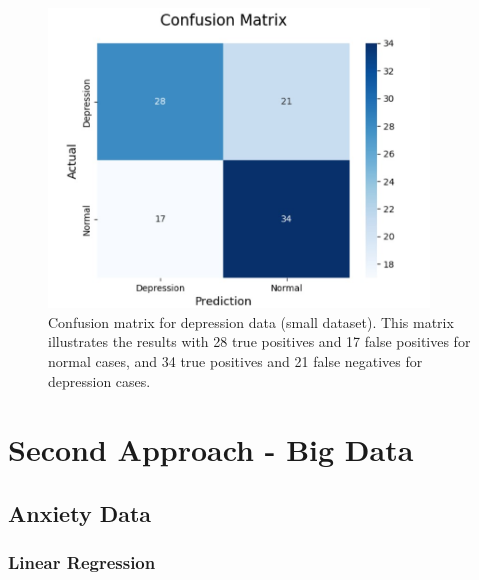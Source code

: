 \documentclass[runningheads,a4paper,11pt]{report}
\begin{document}
\begin{figure}[h]
\centering
\includegraphics[width=0.9\textwidth]{Depression-Data-SmallData.jpg}
\caption[Confusion matrix for depression data (small dataset)]{\centering Confusion matrix for depression data (small dataset). This matrix illustrates the results with 28 true positives and 17 false positives for normal cases, and 34 true positives and 21 false negatives for depression cases.}
\end{figure}

\vspace{1cm} %

\section{Second Approach - Big Data}
\label{section:second}

\subsection{Anxiety Data}
\label{section:anxietydata}

\subsubsection{Linear Regression}
\label{section:linear}
\end{document}
